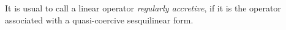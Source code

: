 \documentclass[11pt,twoside]{article}
\begin{document}

\subparagraph{}
It is usual to call a linear operator \textit{regularly accretive},
if it is the operator associated with a quasi-coercive sesquilinear form.
\end{document}
